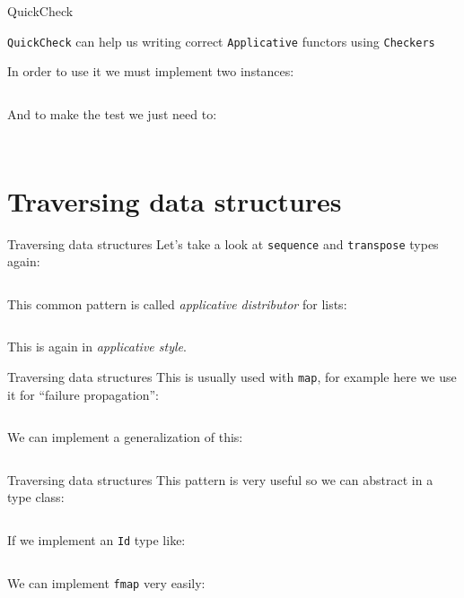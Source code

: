 \documentclass[10pt]{beamer}
\newcommand\Fontvi{\fontsize{10}{12}\selectfont}
\begin{document}
\begin{frame}{QuickCheck}

  \verb~QuickCheck~ can help us writing correct \verb~Applicative~
  functors using \verb~Checkers~

  In order to use it we must implement two instances:

  \inputminted{haskell}{./src/ArbitraryEqClass.hs}

  And to make the test we just need to:

  \inputminted{haskell}{./src/trigger.hs}
\end{frame}

\begin{frame}[standout]
  \Fontvi
  \inputminted{text}{./src/testOut.txt}
\end{frame}

\section{Traversing data structures}

\begin{frame}{Traversing data structures}
  Let's take a look at \verb~sequence~ and \verb~transpose~ types
  again:

  \inputminted{haskell}{./src/trav_typ.hs}

  This common pattern is called \textit{applicative distributor} for
  lists:

  \inputminted{haskell}{./src/dist.hs}

  This is again in \textit{applicative style}.
\end{frame}

\begin{frame}{Traversing data structures}
  This is usually used with \verb~map~, for example here we use it for
  ``failure propagation'':

  \inputminted{haskell}{./src/flakyMap.hs}

  We can implement a generalization of this:

  \inputminted{haskell}{./src/traverse.hs}
\end{frame}

\begin{frame}{Traversing data structures}
  This pattern is very useful so we can abstract in a type class:

  \inputminted{haskell}{./src/traversable.hs}

  If we implement an \verb~Id~ type like:

  \inputminted{haskell}{./src/Id.hs}

  We can implement \verb~fmap~ very easily:

  \inputminted{haskell}{./src/traversable_fmap.hs}

\end{frame}
\end{document}
